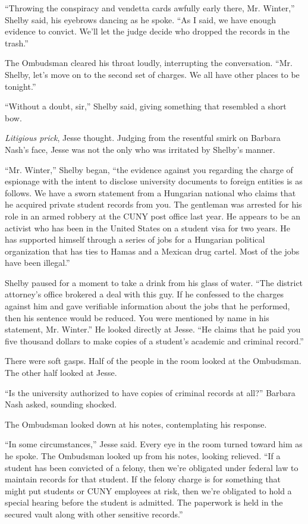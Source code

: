 \documentclass[12pt]{book}
\begin{document}
``Throwing the conspiracy and vendetta cards awfully early there, Mr. Winter,'' Shelby said, his eyebrows dancing as he spoke.  ``As I said, we have enough evidence to convict.  We'll let the judge decide who dropped the records in the trash.''

The Ombudsman cleared his throat loudly, interrupting the conversation.  ``Mr. Shelby, let's move on to the second set of charges.  We all have other places to be tonight.''

``Without a doubt, sir,'' Shelby said, giving something that resembled a short bow.

\emph{Litigious prick}, Jesse thought.  Judging from the resentful smirk on Barbara Nash's face, Jesse was not the only who was irritated by Shelby's manner.

``Mr. Winter,'' Shelby began, ``the evidence against you regarding the charge of espionage with the intent to disclose university documents to foreign entities is as follows.  We have a sworn statement from a Hungarian national who claims that he acquired private student records from you.  The gentleman was arrested for his role in an armed robbery at the CUNY post office last year.  He appears to be an activist who has been in the United States on a student visa for two years.  He has supported himself through a series of jobs for a Hungarian political organization that has ties to Hamas and a Mexican drug cartel.  Most of the jobs have been illegal.''

Shelby paused for a moment to take a drink from his glass of water.  ``The district attorney's office brokered a deal with this guy.  If he confessed to the charges against him and gave verifiable information about the jobs that he performed, then his sentence would be reduced.  You were mentioned by name in his statement, Mr. Winter.''  He looked directly at Jesse.  ``He claims that he paid you five thousand dollars to make copies of a student's academic and criminal record.''

There were soft gasps.  Half of the people in the room looked at the Ombudsman.  The other half looked at Jesse.

``Is the university authorized to have copies of criminal records at all?'' Barbara Nash asked, sounding shocked.

The Ombudsman looked down at his notes, contemplating his response.

``In some circumstances,'' Jesse said.  Every eye in the room turned toward him as he spoke.  The Ombudsman looked up from his notes, looking relieved.  ``If a student has been convicted of a felony, then we're obligated under federal law to maintain records for that student.  If the felony charge is for something that might put students or CUNY employees at risk, then we're obligated to hold a special hearing before the student is admitted.  The paperwork is held in the secured vault along with other sensitive records.''
\end{document}
